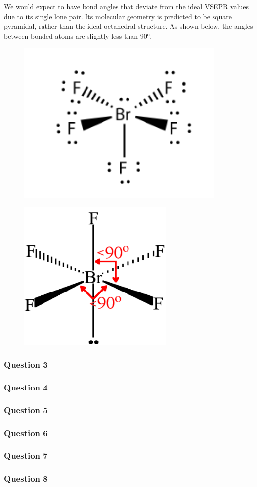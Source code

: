 \documentclass[11pt,a4paper]{article}
\begin{document}
	We would expect  to have bond angles that deviate from the ideal VSEPR values due to its single lone pair. Its molecular geometry is predicted to be square pyramidal, rather 			than the ideal octahedral structure.  As shown below, the  angles between bonded atoms are slightly less than 90$^\text{o}$.

\newpage 

	\begin{figure}[h]
		\centering
		\includegraphics[width=4in]{BrF5.pdf}
	\end{figure}
	
	\begin{figure}[h]
		\centering
		\includegraphics[width=3in]{BrF5_.pdf}
	\end{figure}

\newpage

\subsubsection*{Question 3}
	
\subsubsection*{Question 4}

\subsubsection*{Question 5} 

\subsubsection*{Question 6}

\subsubsection*{Question 7}

\subsubsection*{Question 8}  
	
\end{document}
